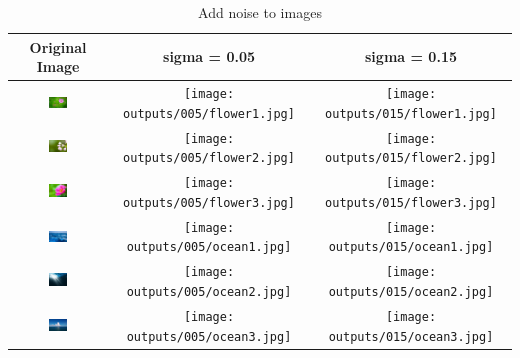\documentclass{article}%
\begin{document}
\begin{table}[ht]%
\begin{center}%
\caption{Add noise to images}%
\begin{tabular}{|c|c|c|}%
\hline%
Original Image&sigma = 0.05&sigma = 0.15\\%
\hline%
\includegraphics[width=0.2\textwidth]{images/flower1.jpg}&\texttt{[image: outputs/005/flower1.jpg]}&\texttt{[image: outputs/015/flower1.jpg]}\\%
\hline%
\includegraphics[width=0.2\textwidth]{images/flower2.jpg}&\texttt{[image: outputs/005/flower2.jpg]}&\texttt{[image: outputs/015/flower2.jpg]}\\%
\hline%
\includegraphics[width=0.2\textwidth]{images/flower3.jpg}&\texttt{[image: outputs/005/flower3.jpg]}&\texttt{[image: outputs/015/flower3.jpg]}\\%
\hline%
\includegraphics[width=0.2\textwidth]{images/ocean1.jpg}&\texttt{[image: outputs/005/ocean1.jpg]}&\texttt{[image: outputs/015/ocean1.jpg]}\\%
\hline%
\includegraphics[width=0.2\textwidth]{images/ocean2.jpg}&\texttt{[image: outputs/005/ocean2.jpg]}&\texttt{[image: outputs/015/ocean2.jpg]}\\%
\hline%
\includegraphics[width=0.2\textwidth]{images/ocean3.jpg}&\texttt{[image: outputs/005/ocean3.jpg]}&\texttt{[image: outputs/015/ocean3.jpg]}\\%

\end{tabular}
\end{center}
\end{table}
\end{document}
